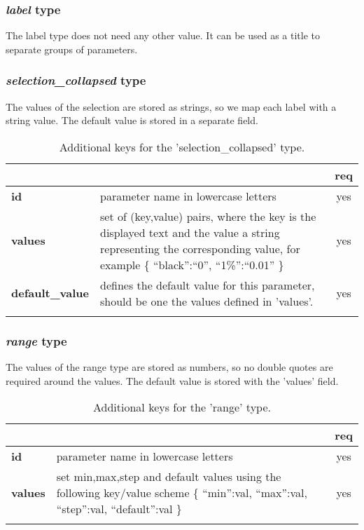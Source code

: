 \subsubsection{ \emph{label} type}
The label type does not need any other value. It can be used as a title to 
separate groups of parameters.

\subsubsection{ \emph{selection\_collapsed} type}

The values of the selection are stored as strings, so we map each label with a 
string value. The default value is stored in a separate field.

\begin{longtable}{|>{\bf}L{\linewidth}|L{\linewidth}|c|}
\hline
      &  & {\bf req} 
\tabularnewline \hline \hline
 id     & parameter name in lowercase letters & yes \\ \hline
 values & set of (key,value) pairs, where the key is the displayed text and the 
value a string representing the corresponding value, for example \{ 
``black'':``0'', ``1\%'':``0.01'' \} & yes
                      \\ \hline
 default\_value & defines the default value for this parameter, should be one 
the values defined in 'values'. & yes \\ \hline
\caption{Additional keys for the 'selection\_collapsed' type.}
\end{longtable}

\subsubsection{ \emph{range} type}

The values of the range type are stored as numbers, so no double quotes are 
required around the values. The default value is stored with the 'values' field.

\begin{longtable}{|>{\bf}L{\linewidth}|L{\linewidth}|c|}
\hline
      &  & {\bf req} 
\tabularnewline \hline \hline
 id     & parameter name in lowercase letters  & yes \\ \hline
 values & set min,max,step and default values using the following key/value 
scheme \{ ``min'':val, ``max'':val, ``step'':val, ``default'':val \} & yes
                      \\ \hline
\caption{Additional keys for the 'range' type.}
\end{longtable}

